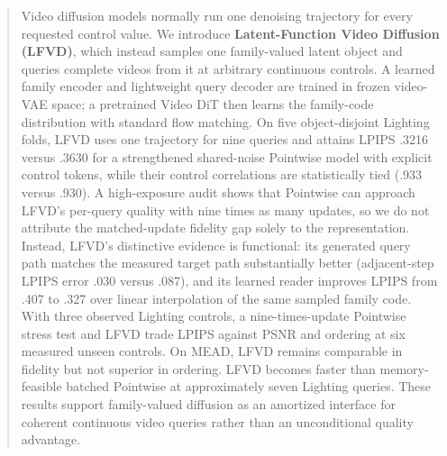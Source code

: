 \begin{abstract}
Video diffusion models normally run one denoising trajectory for every
requested control value. We introduce \textbf{Latent-Function Video
Diffusion (LFVD)}, which instead samples one family-valued latent object and
queries complete videos from it at arbitrary continuous controls. A learned
family encoder and lightweight query decoder are trained in frozen video-VAE
space; a pretrained Video DiT then learns the family-code distribution with
standard flow matching. On five object-disjoint Lighting folds, LFVD uses one
trajectory for nine queries and attains LPIPS .3216 versus .3630 for a
strengthened shared-noise Pointwise model with explicit control tokens, while
their control correlations are statistically tied (.933 versus .930). A
high-exposure audit shows that Pointwise can approach LFVD's per-query quality
with nine times as many updates, so we do not attribute the matched-update
fidelity gap solely to the representation. Instead, LFVD's distinctive
evidence is functional: its generated query path matches the measured target
path substantially better (adjacent-step LPIPS error .030 versus .087), and
its learned reader improves LPIPS from .407 to .327 over linear interpolation
of the same sampled family code. With three observed Lighting controls, a
nine-times-update Pointwise stress test and LFVD trade LPIPS against PSNR and
ordering at six measured unseen controls. On MEAD, LFVD remains comparable in
fidelity but not superior in ordering. LFVD becomes faster than memory-feasible
batched Pointwise at approximately seven Lighting queries. These results
support family-valued diffusion as an amortized interface for coherent
continuous video queries rather than an unconditional quality advantage.

\end{abstract}
